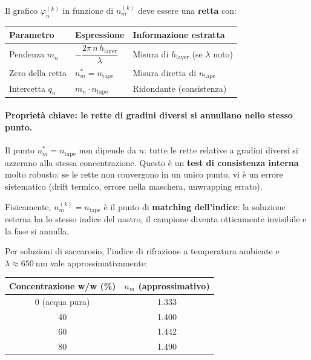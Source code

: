 Il grafico $\varphi_n^{(k)}$ in funzione di $n_m^{(k)}$ deve essere una
\textbf{retta} con:

\begin{center}
\begin{tabular}{lll}
\hline\hline
Parametro & Espressione & Informazione estratta \\
\hline
Pendenza $m_n$ & $-\dfrac{2\pi\, n\, h_\text{layer}}{\lambda}$ &
  Misura di $h_\text{layer}$ (se $\lambda$ noto) \\[10pt]
Zero della retta & $n_m^* = n_\text{tape}$ &
  Misura diretta di $n_\text{tape}$ \\[6pt]
Intercetta $q_n$ & $m_n \cdot n_\text{tape}$ &
  Ridondante (consistenza) \\
\hline\hline
\end{tabular}
\end{center}

\paragraph{Proprietà chiave: le rette di gradini diversi si annullano nello stesso punto.}
Il punto $n_m^* = n_\text{tape}$ non dipende da $n$: tutte le rette relative
a gradini diversi si azzerano alla stessa concentrazione. Questo è un
\textbf{test di consistenza interna} molto robusto: se le rette non convergono
in un unico punto, vi è un errore sistematico (drift termico, errore nella
maschera, unwrapping errato).

Fisicamente, $n_m^{(k)} = n_\text{tape}$ è il punto di \textbf{matching dell'indice}:
la soluzione esterna ha lo stesso indice del nastro, il campione diventa
otticamente invisibile e la fase si annulla.

Per soluzioni di saccarosio, l'indice di rifrazione a temperatura ambiente
e $\lambda \approx 650\ \text{nm}$ vale approssimativamente:

\begin{center}
\begin{tabular}{cc}
\hline\hline
Concentrazione w/w (\%) & $n_m$ (approssimativo) \\
\hline
0  (acqua pura)   & 1.333 \\
40                & 1.400 \\
60                & 1.442 \\
80                & 1.490 \\
\hline\hline
\end{tabular}
\end{center}

